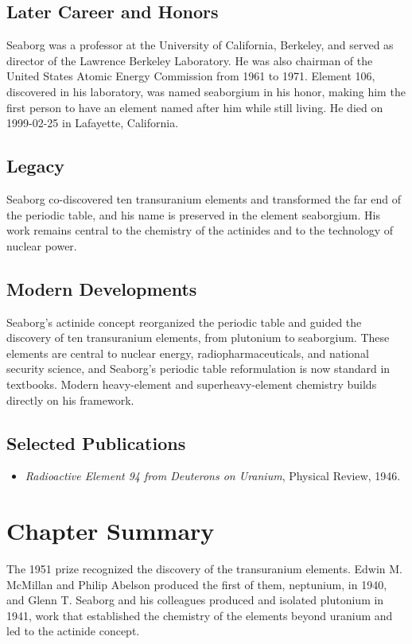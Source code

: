 \subsection*{Later Career and Honors}

Seaborg was a professor at the University of California, Berkeley, and served as director of the Lawrence Berkeley Laboratory. He was also chairman of the United States Atomic Energy Commission from 1961 to 1971. Element 106, discovered in his laboratory, was named seaborgium in his honor, making him the first person to have an element named after him while still living. He died on 1999-02-25 in Lafayette, California.

\subsection*{Legacy}

Seaborg co-discovered ten transuranium elements and transformed the far end of the periodic table, and his name is preserved in the element seaborgium. His work remains central to the chemistry of the actinides and to the technology of nuclear power.

\subsection*{Modern Developments}

Seaborg's actinide concept reorganized the periodic table and guided the discovery of ten transuranium elements, from plutonium to seaborgium. These elements are central to nuclear energy, radiopharmaceuticals, and national security science, and Seaborg's periodic table reformulation is now standard in textbooks. Modern heavy-element and superheavy-element chemistry builds directly on his framework.

\subsection*{Selected Publications}

\begin{itemize}

\item \emph{Radioactive Element 94 from Deuterons on Uranium}, Physical Review, 1946.

\end{itemize}

\clearpage

\section*{Chapter Summary}

The 1951 prize recognized the discovery of the transuranium elements. Edwin M. McMillan and Philip Abelson produced the first of them, neptunium, in 1940, and Glenn T. Seaborg and his colleagues produced and isolated plutonium in 1941, work that established the chemistry of the elements beyond uranium and led to the actinide concept.


